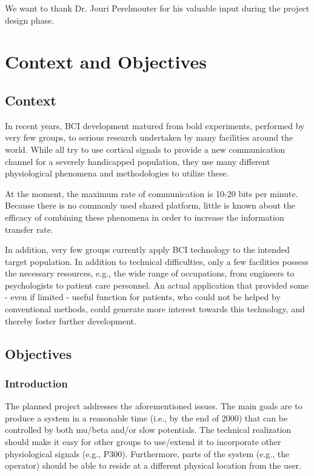 \documentclass[letterpaper,oneside,12pt]{book}
\begin{document}
We want to thank Dr. Jouri Perelmouter for his valuable input during the 
project design phase.


\chapter{Context and Objectives}

\section{Context}

In recent years, BCI development matured from bold experiments, performed by 
very few groups, to serious research undertaken by many facilities around the 
world. While all try to use cortical signals to provide a new communication 
channel for a severely handicapped population, they use many different 
physiological phenomena and methodologies to utilize these.

At the moment, the maximum rate of communication is 10-20 bits per minute. 
Because there is no commonly used shared platform, little is known about the 
efficacy of combining these phenomena in order to increase the information 
transfer rate.

In addition, very few groups currently apply BCI technology to the intended 
target population. In addition to technical difficulties, only a few facilities 
possess the necessary resources, e.g., the wide range of occupations, from 
engineers to psychologists to patient care personnel. An actual application that 
provided some - even if limited - useful function for patients, who could not be 
helped by conventional methods, could generate more interest towards this 
technology, and thereby foster further development.

\section{Objectives}

\subsection{Introduction}

The planned project addresses the aforementioned issues. The main goals are to 
produce a system in a reasonable time (i.e., by the end of 2000) that can be 
controlled by both mu/beta and/or slow potentials. The technical realization 
should make it easy for other groups to use/extend it to incorporate other 
physiological signals (e.g., P300). Furthermore, parts of the system (e.g., the 
operator) should be able to reside at a different physical location from the 
user.
\end{document}

